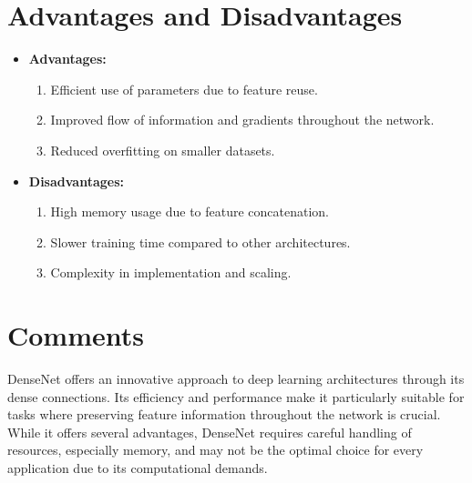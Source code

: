 \section{Advantages and Disadvantages}
\begin{itemize}
    \item \textbf{Advantages:}
    \begin{enumerate}
        \item Efficient use of parameters due to feature reuse.
        \item Improved flow of information and gradients throughout the network.
        \item Reduced overfitting on smaller datasets.
    \end{enumerate}
    \item \textbf{Disadvantages:}
    \begin{enumerate}
        \item High memory usage due to feature concatenation.
        \item Slower training time compared to other architectures.
        \item Complexity in implementation and scaling.
    \end{enumerate}
\end{itemize}

\section{Comments}
DenseNet offers an innovative approach to deep learning architectures through its dense connections. Its efficiency and performance make it particularly suitable for tasks where preserving feature information throughout the network is crucial. While it offers several advantages, DenseNet requires careful handling of resources, especially memory, and may not be the optimal choice for every application due to its computational demands.
